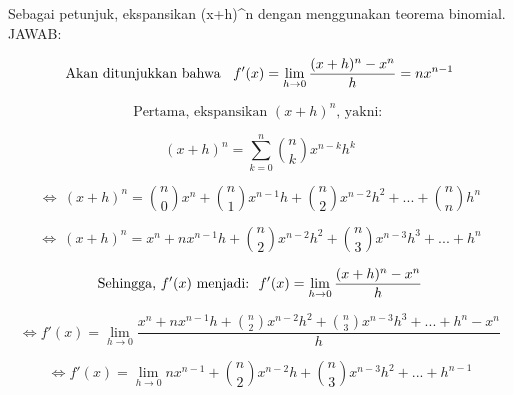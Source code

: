 \documentclass[a4paper,10pt]{article}
\begin{document}
\begin{eulernotebook}
\begin{eulercomment}
\begin{eulercomment}
\begin{eulercomment}
\begin{eulercomment}
\begin{eulercomment}
\begin{eulercomment}
\begin{eulercomment}
\begin{eulercomment}
\begin{eulercomment}
Sebagai petunjuk, ekspansikan (x+h)\textasciicircum{}n dengan menggunakan teorema
binomial.\\
JAWAB:\\
\end{eulercomment}
\begin{eulerformula}
\[
\text{Akan ditunjukkan bahwa \: $f'(x)=\lim_{h\to 0} \frac{(x+h)^n-x^n}{h}=nx^{n-1}$}
\]
\end{eulerformula}
\begin{eulercomment}
\end{eulercomment}
\begin{eulerformula}
\[
\text{Pertama, ekspansikan $(x+h)^n$, yakni: }
\]
\end{eulerformula}
\begin{eulerformula}
\[
\text{$(x+h)^n=\sum_{k=0}^{n} \binom{n}{k}x^{n-k}h^k$}
\]
\end{eulerformula}
\begin{eulercomment}
\end{eulercomment}
\begin{eulerformula}
\[
\text{$\Leftrightarrow \: (x+h)^n=\binom{n}{0}x^{n}+\binom{n}{1}x^{n-1}h+\binom{n}{2}x^{n-2}h^2+ ...+\binom{n}{n}h^n$}
\]
\end{eulerformula}
\begin{eulercomment}
\end{eulercomment}
\begin{eulerformula}
\[
\text{$\Leftrightarrow \: (x+h)^n=x^{n}+nx^{n-1}h+\binom{n}{2}x^{n-2}h^2+\binom{n}{3}x^{n-3}h^3+ ...+h^n$}
\]
\end{eulerformula}
\begin{eulercomment}
\end{eulercomment}
\begin{eulerformula}
\[
\text{Sehingga, $f'(x)$ menjadi:\: $f'(x)=\lim_{h\to 0} \frac{(x+h)^n-x^n}{h}$}
\]
\end{eulerformula}
\begin{eulercomment}
\end{eulercomment}
\begin{eulerformula}
\[
\text{$\Leftrightarrow f'(x)=\lim_{h\to 0} \frac{x^{n}+nx^{n-1}h+\binom{n}{2}x^{n-2}h^2+\binom{n}{3}x^{n-3}h^3+ ...+h^n-x^n}{h}$}
\]
\end{eulerformula}
\begin{eulercomment}
\end{eulercomment}
\begin{eulerformula}
\[
\text{$\Leftrightarrow f'(x)=\lim_{h\to 0} nx^{n-1}+\binom{n}{2}x^{n-2}h+\binom{n}{3}x^{n-3}h^2+ ...+h^{n-1}$}
\]
\end{eulerformula}
\end{eulercomment}
\end{eulercomment}
\end{eulercomment}
\end{eulercomment}
\end{eulercomment}
\end{eulercomment}
\end{eulercomment}
\end{eulercomment}
\end{eulernotebook}
\end{document}
